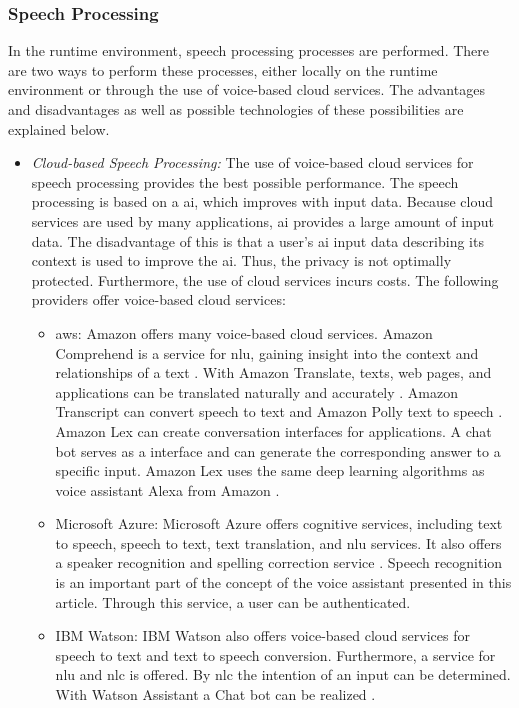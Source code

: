 \subsubsection{Speech Processing}
In the runtime environment, speech processing processes are performed. There are two ways to perform these processes, either locally on the runtime environment or through the use of voice-based cloud services. The advantages and disadvantages as well as possible technologies of these possibilities are explained below.
\begin{itemize}
	\item \textsl{Cloud-based Speech Processing:} The use of voice-based cloud services for speech processing provides the best possible performance. The speech processing is based on a \ac{ai}, which improves with input data. Because cloud services are used by many applications, \ac{ai} provides a large amount of input data. The disadvantage of this is that a user's \ac{ai} input data describing its context is used to improve the \ac{ai}. Thus, the privacy is not optimally protected. Furthermore, the use of cloud services incurs costs. The following providers offer voice-based cloud services:
	\begin{itemize}
		\item \ac{aws}: Amazon offers many voice-based cloud services. Amazon Comprehend is a service for \ac{nlu}, gaining insight into the context and relationships of a text \cite{AmazonComprehed}. With Amazon Translate, texts, web pages, and applications can be translated naturally and accurately \cite{AmazonTranslate}. Amazon Transcript can convert speech to text and Amazon Polly text to speech \cite{AmazonTranscript} \cite {AmazonPolly}. Amazon Lex can create conversation interfaces for applications. A chat bot serves as a  interface and can generate the corresponding answer to a specific input. Amazon Lex uses the same deep learning algorithms as voice assistant Alexa from Amazon \cite{AmazonLex}.
		\item Microsoft Azure: Microsoft Azure offers cognitive services, including text to speech, speech to text, text translation, and \ac{nlu} services. It also offers a speaker recognition and spelling correction service \cite{MicrosoftAzureCognitiveServices}. Speech recognition is an important part of the concept of the voice assistant presented in this article. Through this service, a user can be authenticated.
		\item IBM Watson: IBM Watson also offers voice-based cloud services for speech to text and text to speech conversion. Furthermore, a service for \ac{nlu} and \ac{nlc} is offered. By \ac{nlc} the intention of an input can be determined. With Watson Assistant a Chat bot can be realized \cite{IBMWatsonSpeechServices}.

\end{itemize}
\end{itemize}

